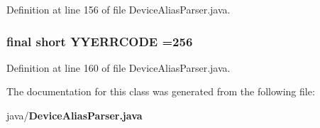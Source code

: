Definition at line 156 of file Device\-Alias\-Parser.\-java.

\subsubsection[{Y\-Y\-E\-R\-R\-C\-O\-D\-E}]{\setlength{\rightskip}{0pt plus 5cm}final short Y\-Y\-E\-R\-R\-C\-O\-D\-E =256\hspace{0.3cm}{\ttfamily [static]}}\label{classorg_1_1smallfoot_1_1parser_1_1zone_1_1DeviceAliasParser_a1c58472ea6621d2f613831e08d10dba3}


Definition at line 160 of file Device\-Alias\-Parser.\-java.



The documentation for this class was generated from the following file\-:\begin{DoxyCompactItemize}
\item 
java/{\bf Device\-Alias\-Parser.\-java}\end{DoxyCompactItemize}

